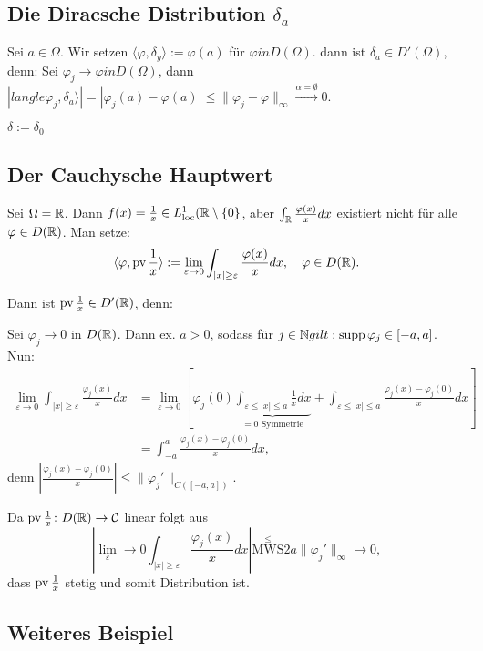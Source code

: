 \subsection{Die Diracsche Distribution $\delta_a$}

Sei $a \in \Omega$.
Wir setzen $\langle \varphi, \delta_y\rangle := \varphi(a)$ für $\varphi in D(\Omega)$.
dann ist $\delta_a \in D'(\Omega)$, denn: Sei $\varphi_j \to \varphi in D(\Omega)$, dann $|langle \varphi_j, \delta_a \rangle| = |\varphi_j(a) - \varphi(a)| \leq \|\varphi_j - \varphi\|_\infty \overset{\alpha = \emptyset}{\to} 0$.

\begin{ntion}
  $\delta := \delta_0$
\end{ntion}

\subsection{Der Cauchysche Hauptwert}
Sei $\Omega = \mathbb{R}$.
Dann $f(x) = \frac{1}{x} \in L^1_{\operatorname{loc}}(\mathbb{R}\setminus\{0\}$, aber $\int_{\mathbb{R}} \frac{\varphi(x)}{x} dx$ existiert nicht für alle $\varphi \in D(\mathbb{R})$.
Man setze:
$$
\langle \varphi,\operatorname{pv} \frac{1}{x} \rangle := \lim_{\varepsilon \to 0} \int_{|x| \geq \varepsilon} \frac{\varphi(x)}{x} dx, \quad \varphi \in D(\mathbb{R}).
$$

Dann ist $\operatorname{pv} \frac{1}{x} \in D'(\mathbb{R})$, denn:

Sei $\varphi_j \to 0$ in $D(\mathbb{R})$.
Dann ex. $a > 0$, sodass für $j \in \mathbb{N} gilt: \operatorname{supp} \varphi_j \in [-a,a]$.
Nun:
\begin{align*}
\lim_{\varepsilon \to 0} \int_{|x| \geq \varepsilon} \frac{\varphi_j(x)}{x} dx 
&= \lim_{\varepsilon \to 0} \left[ \varphi_j(0) \underbrace{\int_{\varepsilon \leq |x| \leq a} \frac{1}{x} dx}_{= 0 \text{ Symmetrie}}
+ \int_{\varepsilon \leq |x| \leq a} \frac{\varphi_j(x) - \varphi_j(0)}{x} dx \right] \\
&= \int_{-a}^a \frac{\varphi_j(x) - \varphi_j(0)}{x} dx,
\end{align*}
denn $|\frac{\varphi_j(x) - \varphi_j(0)}{x}|\leq \|\varphi_j'\|_{C([-a,a])}$.

Da $\operatorname{pv} \frac{1}{x} \colon D(\mathbb{R}) \to \mathcal{C}$ linear folgt aus
$$
| \lim_\varepsilon \to 0 \int_{|x| \geq \varepsilon} \frac{\varphi_j(x)}{x} dx | \overset{\leq}{\text{MWS}} 2a \| \varphi_j'\|_\infty \to 0,
$$
dass $\operatorname{pv} \frac{1}{x}$ stetig und somit Distribution ist.

\subsection{Weiteres Beispiel}

